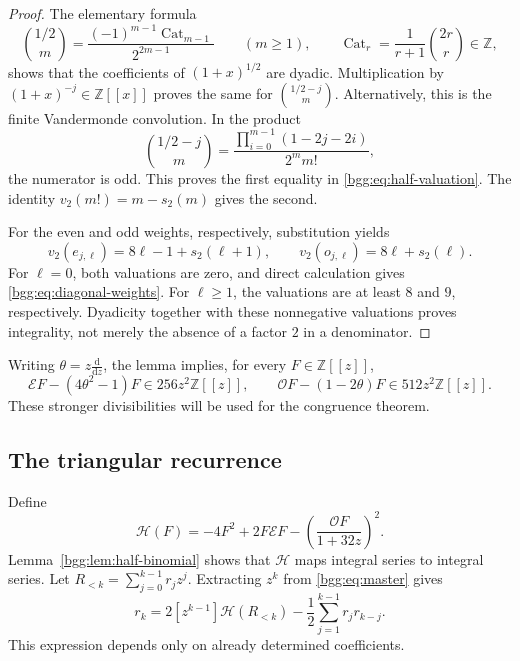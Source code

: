 \documentclass[11pt,a4paper]{article}
\numberwithin{equation}{section}
\theoremstyle{definition}
\theoremstyle{remark}
\theoremstyle{definition}
\newcommand{\Z}{\mathbb Z}
\newcommand{\Eop}{\mathcal E}
\newcommand{\Oop}{\mathcal O}
\newcommand{\Hop}{\mathcal H}
\newcommand{\Cat}{\operatorname{Cat}}
\begin{document}
\begin{proof}
The elementary formula
\[
 \binom{1/2}{m}=\frac{(-1)^{m-1}\Cat_{m-1}}{2^{2m-1}}\qquad(m\ge1),
 \qquad \Cat_r=\frac1{r+1}\binom{2r}{r}\in\Z,
\]
shows that the coefficients of $(1+x)^{1/2}$ are dyadic. Multiplication by
$(1+x)^{-j}\in\Z[[x]]$ proves the same for
$\binom{1/2-j}{m}$. Alternatively, this is the finite Vandermonde convolution.
In the product
\[
 \binom{1/2-j}{m}
 =\frac{\prod_{i=0}^{m-1}(1-2j-2i)}{2^m m!},
\]
the numerator is odd. This proves the first equality in
\eqref{bgg:eq:half-valuation}. The identity
$v_2(m!)=m-s_2(m)$ gives the second.

For the even and odd weights, respectively, substitution yields
\begin{equation}\label{bgg:eq:weight-valuations}
 v_2(e_{j,\ell})=8\ell-1+s_2(\ell+1),\qquad
 v_2(o_{j,\ell})=8\ell+s_2(\ell).
\end{equation}
For $\ell=0$, both valuations are zero, and direct calculation gives
\eqref{bgg:eq:diagonal-weights}. For $\ell\ge1$, the valuations are at least $8$
and $9$, respectively. Dyadicity together with these nonnegative valuations
proves integrality, not merely the absence of a factor $2$ in a denominator.
\end{proof}

Writing $\theta=z\frac{\mathrm d}{\mathrm dz}$, the lemma implies, for every
$F\in\Z[[z]]$,
\begin{equation}\label{bgg:eq:operator-congruences}
 \Eop F-(4\theta^2-1)F\in256z^2\Z[[z]],\qquad
 \Oop F-(1-2\theta)F\in512z^2\Z[[z]].
\end{equation}
These stronger divisibilities will be used for the congruence theorem.

\subsection{The triangular recurrence}

Define
\begin{equation}\label{bgg:eq:H-definition}
 \Hop(F)=-4F^2+2F\Eop F-\left(\frac{\Oop F}{1+32z}\right)^2.
\end{equation}
Lemma~\ref{bgg:lem:half-binomial} shows that $\Hop$ maps integral series to
integral series. Let $R_{<k}=\sum_{j=0}^{k-1}r_jz^j$. Extracting $z^k$ from
\eqref{bgg:eq:master} gives
\begin{equation}\label{bgg:eq:triangular-recurrence}
 \boxed{\displaystyle
 r_k=2[z^{k-1}]\Hop(R_{<k})
     -\frac12\sum_{j=1}^{k-1}r_jr_{k-j}.}
\end{equation}
This expression depends only on already determined coefficients.
\end{document}
